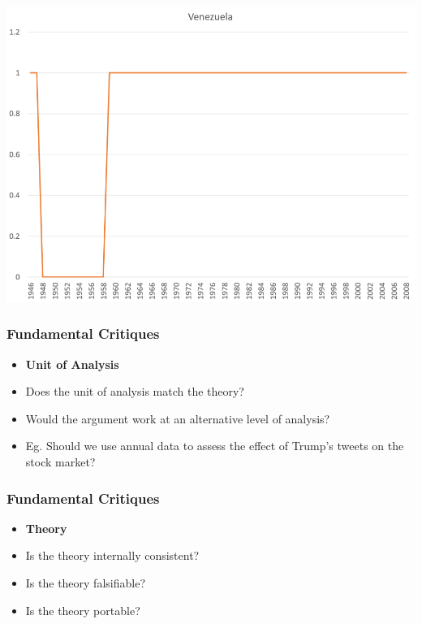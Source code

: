 \documentclass[xcolor=x11names,compress]{beamer}\usepackage[]{graphicx}\usepackage[]{color}
\renewcommand{\(}{\begin{columns}}
\renewcommand{\)}{\end{columns}}
\newcommand{\<}[1]{\begin{column}{#1}}
\renewcommand{\>}{\end{column}}
\begin{document}


\includegraphics[width=\textwidth]{Venezuala_binary.png}


\begin{frame}
\frametitle{Fundamental Critiques}
\begin{itemize}
\item \textbf{Unit of Analysis}
\pause
\item Does the unit of analysis match the theory?
\pause
\item Would the argument work at an alternative level of analysis?
\pause
\item Eg. Should we use annual data to assess the effect of Trump's tweets on the stock market?
\end{itemize}
\end{frame}

\begin{frame}
\frametitle{Fundamental Critiques}
\begin{itemize}
\item \textbf{Theory}
\pause
\item Is the theory internally consistent?
\pause
\item Is the theory falsifiable?
\pause
\item Is the theory portable?
\end{itemize}
\end{frame}
\end{document}

